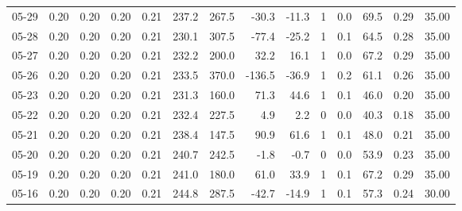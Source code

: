 \begin{threeparttable}
{\begin{tabular}{lrrrrrrrrrrrrr}
  05-29 &          0.20 &          0.20 &          0.20 &        0.21 &               237.2 &               267.5 &      -30.3 &        -11.3 &              1 &                 0.0 &             69.5 &            0.29 &                  35.00 \\
  05-28 &          0.20 &          0.20 &          0.20 &        0.21 &               230.1 &               307.5 &      -77.4 &        -25.2 &              1 &                 0.1 &             64.5 &            0.28 &                  35.00 \\
  05-27 &          0.20 &          0.20 &          0.20 &        0.21 &               232.2 &               200.0 &       32.2 &         16.1 &              1 &                 0.0 &             67.2 &            0.29 &                  35.00 \\
  05-26 &          0.20 &          0.20 &          0.20 &        0.21 &               233.5 &               370.0 &     -136.5 &        -36.9 &              1 &                 0.2 &             61.1 &            0.26 &                  35.00 \\
  05-23 &          0.20 &          0.20 &          0.20 &        0.21 &               231.3 &               160.0 &       71.3 &         44.6 &              1 &                 0.1 &             46.0 &            0.20 &                  35.00 \\
  05-22 &          0.20 &          0.20 &          0.20 &        0.21 &               232.4 &               227.5 &        4.9 &          2.2 &              0 &                 0.0 &             40.3 &            0.18 &                  35.00 \\
  05-21 &          0.20 &          0.20 &          0.20 &        0.21 &               238.4 &               147.5 &       90.9 &         61.6 &              1 &                 0.1 &             48.0 &            0.21 &                  35.00 \\
  05-20 &          0.20 &          0.20 &          0.20 &        0.21 &               240.7 &               242.5 &       -1.8 &         -0.7 &              0 &                 0.0 &             53.9 &            0.23 &                  35.00 \\
  05-19 &          0.20 &          0.20 &          0.20 &        0.21 &               241.0 &               180.0 &       61.0 &         33.9 &              1 &                 0.1 &             67.2 &            0.29 &                  35.00 \\
  05-16 &          0.20 &          0.20 &          0.20 &        0.21 &               244.8 &               287.5 &      -42.7 &        -14.9 &              1 &                 0.1 &             57.3 &            0.24 &                  30.00 \\

\end{tabular}}
\end{threeparttable}
